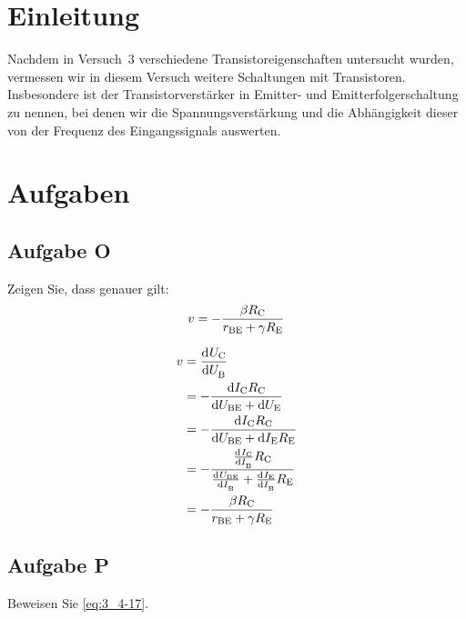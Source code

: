 \FloatBarrier
\section{Einleitung}

Nachdem in Versuch~3 verschiedene Transistoreigenschaften untersucht wurden,
vermessen wir in diesem Versuch weitere Schaltungen mit Transistoren.
Insbesondere ist der Transistorverstärker in Emitter- und
Emitterfolgerschaltung zu nennen, bei denen wir die Spannungsverstärkung und
die Abhängigkeit dieser von der Frequenz des Eingangssignals auswerten.


\FloatBarrier
\section{Aufgaben}

\FloatBarrier
\subsection{Aufgabe O}

\begin{problem}
    Zeigen Sie, dass genauer gilt:
    \begin{equation}
        \label{eq:3_4-14}
        v = - \frac{\beta R_\text{C}}{r_\text{BE} + \gamma R_\text{E}}
    \end{equation}
\end{problem}

\begin{align*}
    v &= \dod \UC\UB\\
      &= -\frac{\dif\IC\RC}{\dif\UBE + \dif\UE}\\
      &= -\frac{\dif\IC\RC}{\dif\UBE + \dif\IE\RE}\\
      &= -\frac{\od\IC\IB\RC}{\od\UBE\IB+\od\IE\IB\RE}\\
      &= -\frac{\beta\RC}{r_\text{BE}+\gamma\RE}
\end{align*}

\FloatBarrier
\subsection{Aufgabe P}

\begin{problem}
    Beweisen Sie \eqref{eq:3_4-17}.
\end{problem}

